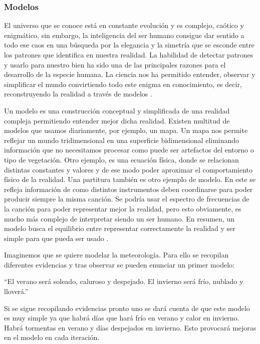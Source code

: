 \subsubsection{Modelos}\label{models}
El universo que se conoce está en constante evolución y es complejo, caótico y enigmático, sin embargo, la inteligencia del ser humano consigue dar sentido a todo ese caos en una búsqueda por la elegancia y la simetría que se esconde entre los patrones que identifica en nuestra realidad. La habilidad de detectar patrones y usarlo para nuestro bien ha sido una de las principales razones para el desarrollo de la especie humana. La ciencia nos ha permitido entender, observar y simplificar el mundo convirtiendo todo este enigma en conocimiento, es decir, reconstruyendo la realidad a través de modelos \cite{marlie}.
\newline

Un modelo es una construcción conceptual y simplificada de una realidad compleja permitiendo entender mejor dicha realidad. Existen multitud de modelos que usamos diariamente, por ejemplo, un mapa. Un mapa nos permite reflejar un mundo tridimensional en una superficie bidimensional eliminando información que no necesitamos procesar como puede ser artefactos del entorno o tipo de vegetación. Otro ejemplo, es una ecuación física, donde se relacionan distintas constantes y valores y de ese modo poder aproximar el comportamiento físico de la realidad. Una partitura también es otro ejemplo de modelo. En este se refleja información de como distintos instrumentos deben coordinarse para poder producir siempre la misma canción. Se podría usar el espectro de frecuencias de la canción para poder representar mejor la realidad, pero esto obviamente, es mucho más complejo de interpretar siendo un ser humano. En resumen, un modelo busca el equilibrio entre representar correctamente la realidad y ser simple para que pueda ser usado \cite{kuhne}.
\newline

Imaginemos que se quiere modelar la meteorología. Para ello se recopilan diferentes evidencias y tras observar se pueden enunciar un primer modelo:

\begin{displayquote}
“El verano será soleado, caluroso y despejado. El invierno será frío, nublado y lloverá.”
\end{displayquote}

Si se sigue recopilando evidencias pronto uno se dará cuenta de que este modelo es muy simple ya que habrá días que hará frío en verano y calor en invierno. Habrá tormentas en verano y días despejados en invierno. Esto provocará mejoras en el modelo en cada iteración. 
\newline

